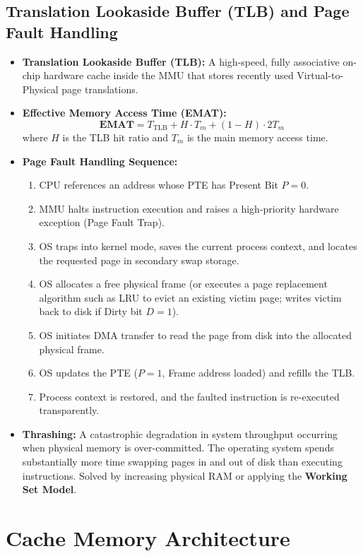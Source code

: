 \documentclass[12pt,a4paper]{article}
\begin{document}
\subsection{Translation Lookaside Buffer (TLB) and Page Fault Handling}
\begin{itemize}[leftmargin=*]
  \item \textbf{Translation Lookaside Buffer (TLB):} A high-speed, fully associative on-chip hardware cache inside the MMU that stores recently used Virtual-to-Physical page translations.
  \item \textbf{Effective Memory Access Time (EMAT):}
  \[
  \mathbf{EMAT} = T_{\mathrm{TLB}} + H \cdot T_m + (1-H) \cdot 2T_m
  \]
  where $H$ is the TLB hit ratio and $T_m$ is the main memory access time.
  \item \textbf{Page Fault Handling Sequence:}
  \begin{enumerate}[leftmargin=*]
    \item CPU references an address whose PTE has Present Bit $P=0$.
    \item MMU halts instruction execution and raises a high-priority hardware exception (Page Fault Trap).
    \item OS traps into kernel mode, saves the current process context, and locates the requested page in secondary swap storage.
    \item OS allocates a free physical frame (or executes a page replacement algorithm such as LRU to evict an existing victim page; writes victim back to disk if Dirty bit $D=1$).
    \item OS initiates DMA transfer to read the page from disk into the allocated physical frame.
    \item OS updates the PTE ($P=1$, Frame address loaded) and refills the TLB.
    \item Process context is restored, and the faulted instruction is re-executed transparently.
  \end{enumerate}
  \item \textbf{Thrashing:} A catastrophic degradation in system throughput occurring when physical memory is over-committed. The operating system spends substantially more time swapping pages in and out of disk than executing instructions. Solved by increasing physical RAM or applying the \textbf{Working Set Model}.
\end{itemize}

\section{Cache Memory Architecture}
\end{document}

